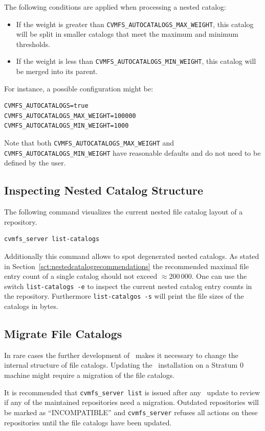 The following conditions are applied when processing a nested catalog:
\begin{itemize}
  \setlength{\itemsep}{1pt}
  \item If the weight is greater than \texttt{CVMFS\_AUTOCATALOGS\_MAX\_WEIGHT}, this catalog will be split in smaller catalogs that meet the maximum and minimum thresholds.
  \item If the weight is less than \texttt{CVMFS\_AUTOCATALOGS\_MIN\_WEIGHT}, this catalog will be merged into its parent.
\end{itemize}
For instance, a possible configuration might be:
\begin{verbatim}
CVMFS_AUTOCATALOGS=true
CVMFS_AUTOCATALOGS_MAX_WEIGHT=100000
CVMFS_AUTOCATALOGS_MIN_WEIGHT=1000
\end{verbatim}

Note that both \texttt{CVMFS\_AUTOCATALOGS\_MAX\_WEIGHT} and \texttt{CVMFS\_AUTOCATALOGS\_MIN\_WEIGHT} have reasonable defaults and do not need to be defined by the user.

\subsection{Inspecting Nested Catalog Structure}
\label{sct:inspectnestedcatalogs}
The following command visualizes the current nested file catalog layout of a repository.

\begin{verbatim}
cvmfs_server list-catalogs
\end{verbatim}

Additionally this command allows to spot degenerated nested catalogs.
As stated in Section~\ref{sct:nestedcatalogrecommendations} the recommended maximal file entry count of a single catalog should not exceed $\approx$200\,000.
One can use the switch \texttt{list-catalogs -e} to inspect the current nested catalog entry counts in the repository.
Furthermore \texttt{list-catalgos -s} will print the file sizes of the catalogs in bytes.

\subsection{Migrate File Catalogs}
In rare cases the further development of \cvmfs\ makes it necessary to change the internal structure of file catalogs.
Updating the \cvmfs\ installation on a Stratum 0 machine might require a migration of the file catalogs.

It is recommended that \texttt{cvmfs\_server list} is issued after any \cvmfs\ update to review if any of the maintained repositories need a migration.
Outdated repositories will be marked as ``INCOMPATIBLE'' and \texttt{cvmfs\_server} refuses all actions on these repositories until the file catalogs have been updated.

